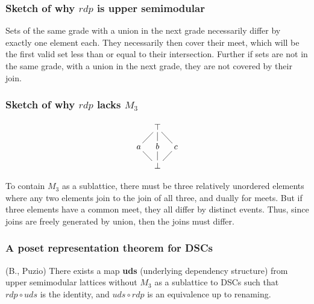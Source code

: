 \documentclass{beamer}
\begin{document}
\begin{frame}[fragile]
\frametitle{Sketch of why \(rdp\) is upper semimodular}
\begin{figure}
\end{figure}
Sets of the same grade with a union in the next grade necessarily differ by exactly one element each. They necessarily then cover their meet, which will be the first valid set less than or equal to their intersection. Further if sets are not in the same grade, with a union in the next grade, they are not covered by their join.
\end{frame}

\begin{frame}[fragile]
\frametitle{Sketch of why \(rdp\) lacks \(M_3\)}
\begin{figure}
\begin{equation*}
    \xymatrix@=1em{& \top \ar@{-}[dl] \ar@{-}[d] \ar@{-}[dr] & \\
      a \ar@{-}[dr] & b \ar@{-}[d] & c \ar@{-}[dl]  \\
       & \bot &}
\end{equation*}
\end{figure}
To contain \(M_3\) as a sublattice, there must be three relatively unordered elements where any two elements join to the join of all three, and dually for meets. But if three elements have a common meet, they all differ by distinct events. Thus, since joins are freely generated by union, then the joins must differ.
\end{frame}

\begin{frame}
\frametitle{A poset representation theorem for DSCs}
\begin{theorem}
(B., Puzio) There exists a map \textbf{uds} (underlying dependency structure) from upper semimodular lattices without \(M_3\) as a sublattice to DSCs such that  \(rdp \circ uds\) is the identity, and \(uds \circ rdp\) is an equivalence up to renaming.
\end{theorem}
\end{frame}
\end{document}
